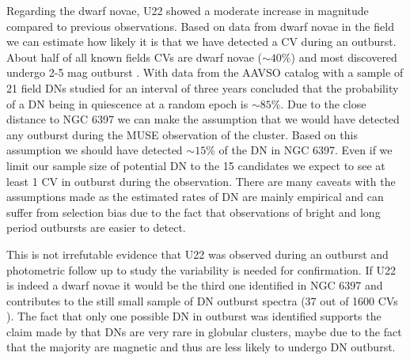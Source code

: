  Regarding the dwarf novae, U22 showed a moderate increase in magnitude compared to previous observations. Based on data from dwarf novae in the field we can estimate how likely it is that we have detected a CV during an outburst. About half of all known fields CVs are dwarf novae ($\sim 40 \%$) and most discovered undergo 2-5 mag outburst \citep{2001PASP..113..764D,warner_cataclysmic_2003}. With data from the AAVSO catalog with a sample of 21 field DNs studied for an interval of three years \cite{Szkody_21DN_1984} concluded that the probability of a DN being in quiescence at a random epoch is $\sim 85 \%$. Due to the close distance to NGC 6397 we can make the assumption that we would have detected any outburst during the MUSE observation of the cluster. Based on this assumption we should have detected $\sim 15 \%$ of the DN in NGC 6397. Even if we limit our sample size of potential DN to the 15 candidates we expect to see at least 1 CV in outburst during the observation. There are many caveats with the assumptions made as the estimated rates of DN are mainly empirical and can suffer from selection bias due to the fact that observations of bright and long period outbursts are easier to detect. 

This is not irrefutable evidence that U22 was observed during an outburst and photometric follow up to study the variability is needed for confirmation. If U22 is indeed a dwarf novae it would be the third one identified in NGC 6397 \citep{shara_erupting_2005} and contributes to the still small sample of DN outburst spectra (37 out of 1600 CVs \citep{2001PASP..113..764D}). The fact that only one possible DN in outburst was identified supports the claim made by \cite{shara_CVsDN_1996} that DNs are very rare in globular clusters, maybe due to the fact that the majority are magnetic and thus are less likely to undergo DN outburst. \\ 

\begin{comment}

When U10 was first identity the X ray data suggested some magetism but we dont see any evidence in the specta. Tere

The X-ray spectral results suggest nine CVs, all with mod-
erately hard TB spectra and internal self-absorption. The in-
trinsic
N
H
, particularly for U10 (CV6), suggests that these sys-
tems may be dominated by magnetic C



variablity 

Discussion:

    Two population:
        Dynamically vs. primordial?
    Magnetism ?
    X-Ray ?


\end{comment}
